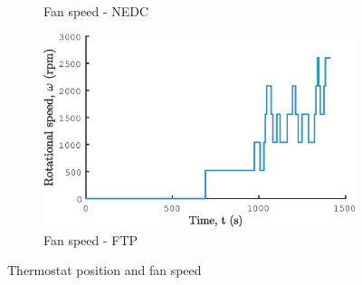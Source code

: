 \begin{figure}[ht]
\begin{subfigure}[b]{0.49\textwidth}
    \caption{Fan speed - NEDC}
    \label{fig:NEDC_fan_speed}
  \end{subfigure}
  \begin{subfigure}[b]{0.49\textwidth}
    \includegraphics[width=\textwidth]{figures/model/FTP/fan_speed.eps}
    \caption{Fan speed - FTP}
    \label{fig:FTP_fan_speed}
  \end{subfigure}
  \caption{Thermostat position and fan speed}\label{fig:thermostat_fan}
\end{figure}

